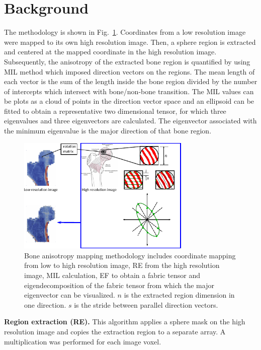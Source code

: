 \documentclass[letterpaper]{article}
\newcommand{\mypar}[1]{{\bf #1.}}
\begin{document}
\section{Background}\label{sec:background}
The methodology is shown in Fig.~\ref{fig:method}. Coordinates from a low resolution image were mapped to its own high resolution image. Then, a sphere region is extracted and centered at the mapped coordinate in the high resolution image. 
Subsequently, the anisotropy of the extracted bone region is quantified by using MIL method which imposed direction vectors on the regions. The mean length of each vector is the sum of the length inside the bone region divided by the number of intercepts which intersect with bone/non-bone transition.
The MIL values can be plots as a cloud of points in the direction vector space and an ellipsoid can be fitted to obtain a representative two dimensional tensor, for which three eigenvalues and three eigenvectors are calculated. The eigenvector associated with the minimum eigenvalue is the major direction of that bone region.

\begin{figure}[ht]
  \centering
  \includegraphics[width=3.25in]{figs/overview.pdf}
  \caption{Bone anisotropy mapping methodology includes coordinate mapping from low to high resolution image, RE from the high resolution image, MIL calculation, EF to obtain a fabric tensor and eigendecomposition of the fabric tensor from which the major eigenvector can be visualized. $n$ is the extracted region dimension in one direction. $s$ is the stride between parallel direction vectors.}
  \label{fig:method}
\end{figure}


\mypar{Region extraction (RE)}
This algorithm applies a sphere mask on the high resolution image and copies the extraction region to a separate array. A multiplication was performed for each image voxel.
\end{document}
